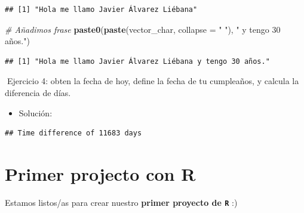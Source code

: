\documentclass[11pt,]{book}
\newenvironment{Shaded}{\begin{snugshade}}{\end{snugshade}}
\newcommand{\CommentTok}[1]{\textcolor[rgb]{0.37,0.37,0.37}{\textit{#1}}}
\newcommand{\DataTypeTok}[1]{\textcolor[rgb]{0.27,0.27,0.27}{#1}}
\newcommand{\KeywordTok}[1]{\textcolor[rgb]{0.27,0.27,0.27}{\textbf{#1}}}
\newcommand{\NormalTok}[1]{#1}
\newcommand{\OperatorTok}[1]{\textcolor[rgb]{0.43,0.43,0.43}{\textbf{#1}}}
\newcommand{\StringTok}[1]{\textcolor[rgb]{0.5,0.5,0.5}{#1}}
\providecommand{\tightlist}{%
  \setlength{\itemsep}{0pt}\setlength{\parskip}{0pt}}
\begin{document}
\begin{verbatim}
## [1] "Hola me llamo Javier Álvarez Liébana"
\end{verbatim}

\begin{Shaded}
\begin{Highlighting}[]
\CommentTok{# Añadimos frase}
\KeywordTok{paste0}\NormalTok{(}\KeywordTok{paste}\NormalTok{(vector_char, }\DataTypeTok{collapse =} \StringTok{" "}\NormalTok{), }\StringTok{" y tengo 30 años."}\NormalTok{)}
\end{Highlighting}
\end{Shaded}

\begin{verbatim}
## [1] "Hola me llamo Javier Álvarez Liébana y tengo 30 años."
\end{verbatim}

📝Ejercicio 4: obten la fecha de hoy, define la fecha de tu cumpleaños, y calcula la diferencia de días.

\begin{itemize}
\tightlist
\item
  Solución:
\end{itemize}

\begin{Shaded}
\end{Shaded}

\begin{verbatim}
## Time difference of 11683 days
\end{verbatim}

\hypertarget{primer-projecto-con-r}{%
\chapter{Primer projecto con R}\label{primer-projecto-con-r}}

Estamos listos/as para crear nuestro \textbf{primer proyecto de \texttt{R}} :)
\end{document}
